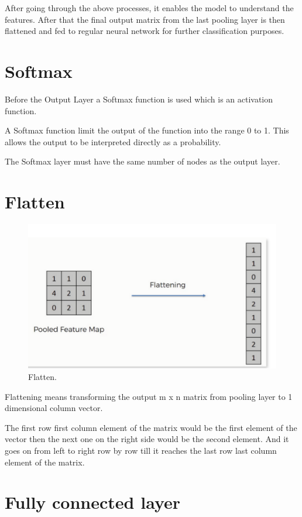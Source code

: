 \documentclass[a4paper,13pt,twoside]{book}
\begin{document}
After going through the above processes, it enables the model to understand the features. After that the final output matrix from the last pooling layer is then flattened and fed to regular neural network for further classification purposes.

\section{Softmax}

Before the Output Layer a Softmax function is used which is an activation function.

A Softmax function limit the output of the function into the range  0 to 1. This allows the output to be interpreted directly as a probability.

The Softmax layer must have the same number of nodes as the output layer.

\section{Flatten}

\begin{figure}[H]
  \includegraphics[width=\linewidth]{Images/flatten(22).png}
  \caption{Flatten.}
  \label{fig:flatten}
\end{figure}

Flattening means transforming the output m x n matrix from pooling layer to 1 dimensional column vector.

The first row first column element of the matrix would be the first element of the vector then the next one on the right side would be the second element. And it goes on from left to right row by row till it reaches the last row last column element of the matrix.

\section{Fully connected layer}
\end{document}
